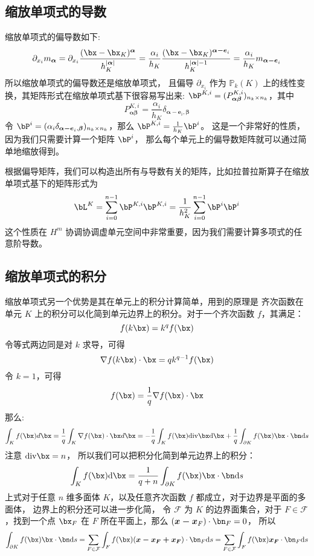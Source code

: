 \subsection{缩放单项式的导数}
缩放单项式的偏导数如下:
$$
\partial_{x_i} m_{\boldsymbol{\alpha}} = 
\partial_{x_i}
\frac{(\bx-\bx_K)^{\boldsymbol{\alpha}}}{h^{|\boldsymbol{\alpha}|}_K}
= \frac{\alpha_i}{h_K}
\frac{(\bx-\bx_K)^{\boldsymbol{\alpha-e}_i}}{h^{|\boldsymbol{\alpha}|-1}_K}
= \frac{\alpha_i}{h_K} m_{\boldsymbol{\alpha-e}_i}
$$
所以缩放单项式的偏导数还是缩放单项式，
且偏导 $\partial_{x_i}$ 作为 $\mathbb{P}_{k}(K)$
上的线性变换，其矩阵形式在缩放单项式基下很容易写出来: $\bP^{K, i} =
(P^{K, i}_{\boldsymbol{\alpha\beta}})_{n_k\times n_k}$，其中
$$
P_{\boldsymbol{\alpha\beta}}^{K, i} = \frac{\alpha_i}{h_K}
\delta_{\boldsymbol{\alpha-e}_i, \boldsymbol{\beta}}
$$
令 $\bP^{i} = (\alpha_i \delta_{\boldsymbol{\alpha-e}_i,
\boldsymbol{\beta}})_{n_k\times n_k}$，那么 $\bP^{K, i} =
\frac{1}{h_K}\bP^{i}$。
这是一个非常好的性质，因为我们只需要计算一个矩阵 $\bP^{i}$，
那么每个单元上的偏导数矩阵就可以通过简单地缩放得到。

根据偏导矩阵，我们可以构造出所有与导数有关的矩阵，比如拉普拉斯算子在缩放单项式基下的矩阵形式为
$$
\bL^{K} = \sum_{i=0}^{n-1} \bP^{K, i}\bP^{K, i}
= \frac{1}{h_K^2} \sum_{i=0}^{n-1} \bP^{i}\bP^{i}
$$
这个性质在 $H^m$
协调协调虚单元空间中非常重要，因为我们需要计算多项式的任意阶导数。

\subsection{缩放单项式的积分}
缩放单项式另一个优势是其在单元上的积分计算简单，用到的原理是
齐次函数在单元 $K$ 上的积分可以化简到单元边界上的积分。对于一个齐次函数 
$f$，其满足：
$$
f(k \bx) = k^q f(\bx)
$$
令等式两边同是对 $k$ 求导，可得
$$
\nabla f(k \bx)\cdot \bx = q k^{q-1} f(\bx)
$$
令 $k = 1$，可得
$$
f(\bx) = \frac{1}{q} \nabla f(\bx)\cdot \bx
$$
那么:
$$
\int_K f(\bx)d\bx = \frac{1}{q} \int_{K}
\nabla f(\bx)\cdot \bx d\bx
= -\frac{1}{q} \int_{K} f(\bx)\mathrm{div}{\bx}
\mathrm{d}\bx
+ \frac{1}{q} \int_{\partial K} f(\bx)\bx\cdot
\bn\mathrm{d}s
$$
注意 $\mathrm{div}{\bx} = n$，
所以我们可以把积分化简到单元边界上的积分：
$$
\int_K f(\bx)\mathrm{d}\bx = \frac{1}{q+n} \int_{\partial K}
f(\bx)\bx\cdot \bn\mathrm{d}s
$$
上式对于任意 $n$ 维多面体 $K$，以及任意齐次函数 $f$
都成立，对于边界是平面的多面体，
边界上的积分还可以进一步化简，
令 $\mathcal{F}$ 为 $K$ 的边界面集合，对于 $F\in \mathcal{F}$，找到一个点
$\bx_F$ 在 $F$ 所在平面上，那么 
$(\boldsymbol{x-x}_F)\cdot \bn_F = 0$，
所以
$$
\int_{\partial K} f(\bx)\bx\cdot \bn
\mathrm{d}s = \sum_{F\in \mathcal{F}}
\int_{F} f(\bx)(\boldsymbol{x-x_F+x_F})\cdot \bn_F
\mathrm{d}s = \sum_{F\in \mathcal{F}}
\int_{F} f(\bx)\boldsymbol{x_F}\cdot \bn_F
\mathrm{d}s
$$

